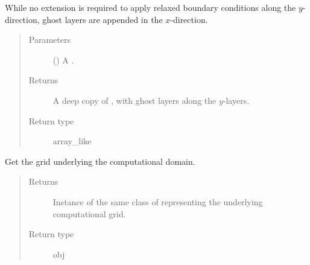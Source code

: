 \documentclass[letterpaper,10pt,english]{sphinxmanual}
\begin{document}
\begin{fulllineitems}

\begin{fulllineitems}
\label{\detokenize{api:dycore.horizontal_boundary_relaxed.RelaxedYZ.from_physical_to_computational_domain}}
While no extension is required to apply relaxed boundary conditions along the \(y\)-direction,
 ghost layers are appended in the \(x\)-direction.
\begin{quote}\begin{description}
\item[{Parameters}] \leavevmode
{} () \textendash{} A .

\item[{Returns}] \leavevmode
A deep copy of , with  ghost layers along the \(y\)-layers.

\item[{Return type}] \leavevmode
array\_like

\end{description}\end{quote}

\end{fulllineitems}


\begin{fulllineitems}
\label{\detokenize{api:dycore.horizontal_boundary_relaxed.RelaxedYZ.get_computational_grid}}
Get the  grid underlying the computational domain.
\begin{quote}\begin{description}
\item[{Returns}] \leavevmode
Instance of the same class of 
representing the underlying computational grid.

\item[{Return type}] \leavevmode
obj

\end{description}\end{quote}


\end{fulllineitems}
\end{fulllineitems}
\end{document}
